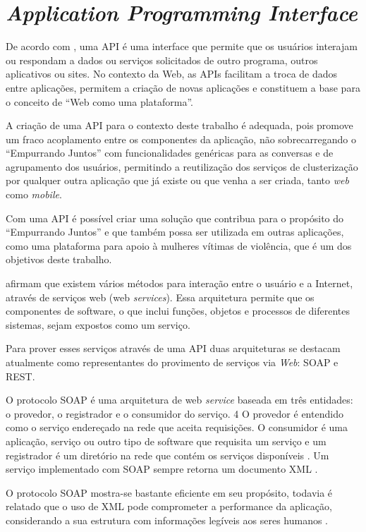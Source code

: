 \chapter{\textit{Application Programming Interface}} \label{cap:api}

De acordo com , uma API é uma interface que permite que os 
usuários interajam ou respondam a dados ou serviços solicitados de outro programa, outros
aplicativos ou sites. No contexto da Web, as APIs facilitam a troca de dados entre 
aplicações, permitem a criação de novas aplicações e constituem a base para o conceito de 
``Web como uma plataforma''.

A criação de uma API para o contexto deste trabalho é adequada, pois promove um fraco acoplamento
entre os componentes da aplicação, não sobrecarregando o ``Empurrando Juntos'' com funcionalidades genéricas
para as conversas e de agrupamento dos usuários,
permitindo a reutilização dos serviços de clusterização por qualquer
outra aplicação que já existe ou que venha a ser criada, tanto \textit{web} como \textit{mobile}.

Com uma API é possível criar uma solução que contribua para o propósito do ``Empurrando Juntos'' e que também
possa ser utilizada em outras aplicações, como uma plataforma para apoio à mulheres vítimas de violência, que é
um dos objetivos deste trabalho.

 afirmam que existem vários métodos para interação entre o  
usuário e a Internet, através de serviços web (web \textit{services}).
Essa arquitetura permite que os componentes de software, o que inclui funções,
objetos e processos de diferentes sistemas, sejam expostos como um serviço.

Para prover esses serviços através de uma API duas arquiteturas se destacam atualmente como representantes do provimento
de serviços via \textit{Web}: SOAP e REST.

O protocolo SOAP é uma arquitetura de web \textit{service} baseada em três entidades: o provedor, o registrador e o consumidor do serviço. 4
O provedor é entendido como o serviço endereçado na rede
que aceita requisições. O consumidor é uma aplicação, serviço ou outro tipo de software que
requisita um serviço e um registrador é um diretório na rede que contém os serviços disponíveis \cite{mumbaikar}.
Um serviço implementado com SOAP sempre retorna um documento XML \cite{wagh2012comparative}.

O protocolo SOAP mostra-se bastante eficiente em seu propósito, 
todavia é relatado que o uso de XML pode comprometer a performance da aplicação, considerando a sua estrutura com informações 
legíveis aos seres humanos \cite{wagh2012comparative, soap_and_ws}.

